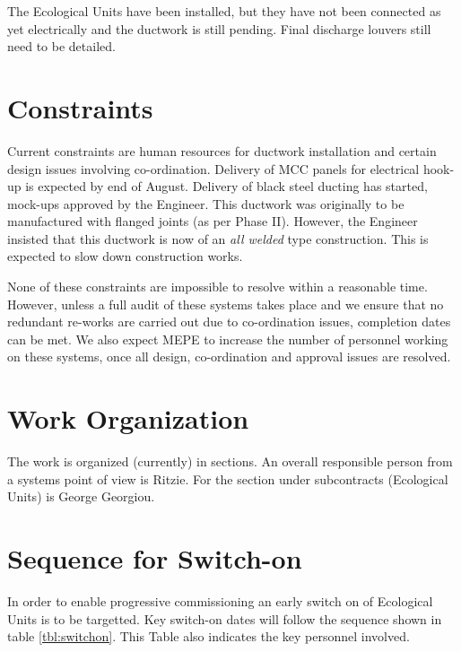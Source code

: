 The Ecological Units have been installed, but they have not been connected as yet electrically and the ductwork is still pending. Final discharge louvers still need to be detailed. 

\section{Constraints}

Current constraints are human resources for ductwork installation and certain design issues involving co-ordination. Delivery of MCC panels for electrical hook-up is expected by end of August. Delivery of black steel ducting has started, mock-ups approved by the Engineer. This ductwork was originally to be manufactured with flanged joints (as per Phase II). However, the Engineer insisted that this ductwork is now of an \emph{all welded} type construction.  This is expected to slow down construction works. 

None of these constraints are impossible to resolve within a reasonable time. However, unless a full audit of these systems takes place  and we ensure that no redundant re-works are carried out due to co-ordination issues, completion dates can be met. We also expect MEPE to increase the number of personnel working on these systems, once all design, co-ordination and approval issues are resolved. 

\ramadaneffect


\section{Work Organization}
The work is organized (currently) in sections. An overall responsible person from a systems point of view is Ritzie. For the section under subcontracts (Ecological Units) is George Georgiou.


\section{Sequence for Switch-on}

In order to enable progressive commissioning an early switch on of Ecological Units is to be targetted. Key switch-on dates will  follow the  sequence shown in table \ref{tbl:switchon}. This Table also indicates the key personnel involved.

